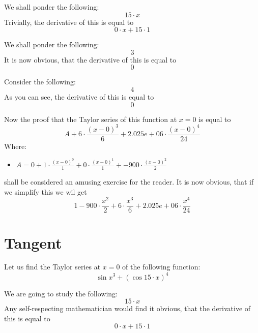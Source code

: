 \documentclass{article}
\begin{document}
We shall ponder the following:
\begin{equation}
15 \cdot x 
\end{equation}
Trivially, the derivative of this is equal to
\begin{equation}
0 \cdot x + 15 \cdot 1 
\end{equation}

We shall ponder the following:
\begin{equation}
3 
\end{equation}
It is now obvious, that the derivative of this is equal to
\begin{equation}
0 
\end{equation}

Consider the following:
\begin{equation}
4 
\end{equation}
As you can see, the derivative of this is equal to
\begin{equation}
0 
\end{equation}

Now the proof that the Taylor series of this function at $x = 0$ is equal to
\begin{equation}
A + 6 \cdot \frac{\left( x - 0 \right) ^{3 } }{6 } + 2.025e+06 \cdot \frac{\left( x - 0 \right) ^{4 } }{24 } 
\end{equation}
Where:
\begin{itemize}
	\item $A = 0 + 1 \cdot \frac{\left( x - 0 \right) ^{0 } }{1 } + 0 \cdot \frac{\left( x - 0 \right) ^{1 } }{1 } + -900 \cdot \frac{\left( x - 0 \right) ^{2 } }{2 } $
\end{itemize}

shall be considered an amusing exercise for the reader.
It is now obvious, that if we simplify this we wil get
\begin{equation}
1 - 900 \cdot \frac{x ^{2 } }{2 } + 6 \cdot \frac{x ^{3 } }{6 } + 2.025e+06 \cdot \frac{x ^{4 } }{24 } 
\end{equation}
\newpage
\section{Tangent}
Let us find the Taylor series at $x = 0$ of the following function:
\begin{equation}
\sin x ^{3 } + \left( \cos 15 \cdot x \right) ^{4 } 
\end{equation}

We are going to study the following:
\begin{equation}
15 \cdot x 
\end{equation}
Any self-respecting mathematician would find it obvious, that the derivative of this is equal to
\begin{equation}
0 \cdot x + 15 \cdot 1 
\end{equation}
\end{document}
